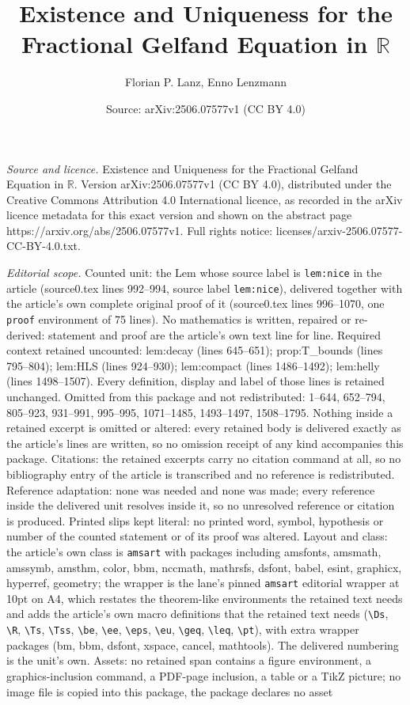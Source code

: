 \documentclass[10pt,a4paper]{amsart}
\title[Existence and Uniqueness for the Fractional Gelfand Equation]{Existence and Uniqueness for the Fractional Gelfand Equation in $\mathbb{R}$}
\author{Florian P. Lanz, Enno Lenzmann}
\date{Source: arXiv:2506.07577v1 (CC BY 4.0)}
\begin{document}
\maketitle

\noindent\emph{Source and licence.} Existence and Uniqueness for the Fractional Gelfand Equation in $\mathbb{R}$. Version arXiv:2506.07577v1 (CC BY 4.0), distributed under the Creative Commons Attribution 4.0 International licence, as recorded in the arXiv licence metadata for this exact version and shown on the abstract page https://arxiv.org/abs/2506.07577v1. Full rights notice: licenses/arxiv-2506.07577-CC-BY-4.0.txt.\par\smallskip

\noindent\textit{Editorial scope.} Counted unit: the Lem whose source label is \texttt{lem:nice} in the article (source0.tex lines 992--994, source label \texttt{lem:nice}), delivered together with the article's own complete original proof of it (source0.tex lines 996--1070, one \texttt{proof} environment of 75 lines). No mathematics is written, repaired or re-derived: statement and proof are the article's own text line for line. Required context retained uncounted: lem:decay (lines 645--651); prop:T\_bounds (lines 795--804); lem:HLS (lines 924--930); lem:compact (lines 1486--1492); lem:helly (lines 1498--1507). Every definition, display and label of those lines is retained unchanged. Omitted from this package and not redistributed: 1--644, 652--794, 805--923, 931--991, 995--995, 1071--1485, 1493--1497, 1508--1795. Nothing inside a retained excerpt is omitted or altered: every retained body is delivered exactly as the article's lines are written, so no omission receipt of any kind accompanies this package. Citations: the retained excerpts carry no citation command at all, so no bibliography entry of the article is transcribed and no reference is redistributed. Reference adaptation: none was needed and none was made; every reference inside the delivered unit resolves inside it, so no unresolved reference or citation is produced. Printed slips kept literal: no printed word, symbol, hypothesis or number of the counted statement or of its proof was altered. Layout and class: the article's own class is \texttt{amsart} with packages including amsfonts, amsmath, amssymb, amsthm, color, bbm, nccmath, mathrsfs, dsfont, babel, esint, graphicx, hyperref, geometry; the wrapper is the lane's pinned \texttt{amsart} editorial wrapper at 10pt on A4, which restates the theorem-like environments the retained text needs and adds the article's own macro definitions that the retained text needs (\texttt{\textbackslash Ds}, \texttt{\textbackslash R}, \texttt{\textbackslash Ts}, \texttt{\textbackslash Tss}, \texttt{\textbackslash be}, \texttt{\textbackslash ee}, \texttt{\textbackslash eps}, \texttt{\textbackslash eu}, \texttt{\textbackslash geq}, \texttt{\textbackslash leq}, \texttt{\textbackslash pt}), with extra wrapper packages (bm, bbm, dsfont, xspace, cancel, mathtools). The delivered numbering is the unit's own. Assets: no retained span contains a figure environment, a graphics-inclusion command, a PDF-page inclusion, a table or a TikZ picture; no image file is copied into this package, the package declares no asset 
\end{document}
